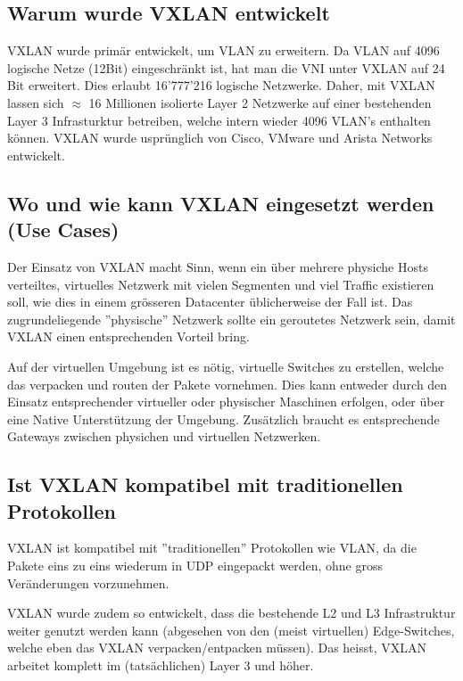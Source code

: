 \subsection{Warum wurde VXLAN entwickelt}
VXLAN wurde primär entwickelt, um VLAN zu erweitern. Da VLAN auf 4096 logische Netze (12Bit) eingeschränkt ist, hat man die VNI unter VXLAN auf 24 Bit erweitert. Dies erlaubt 16'777'216 logische Netzwerke. Daher, mit VXLAN lassen sich $\approx$ 16 Millionen isolierte Layer 2 Netzwerke auf einer bestehenden Layer 3 Infrasturktur betreiben, welche intern wieder 4096 VLAN's enthalten können. VXLAN wurde usprünglich von Cisco, VMware und Arista Networks entwickelt. 

\subsection{Wo und wie kann VXLAN eingesetzt werden (Use Cases)}

Der Einsatz von VXLAN macht Sinn, wenn ein über mehrere physiche Hosts verteiltes, virtuelles Netzwerk mit vielen Segmenten und viel Traffic existieren soll, wie dies in einem grösseren Datacenter üblicherweise der Fall ist. Das zugrundeliegende ''physische'' Netzwerk sollte ein geroutetes Netzwerk sein, damit VXLAN einen entsprechenden Vorteil bring.

Auf der virtuellen Umgebung ist es nötig, virtuelle Switches zu erstellen, welche das verpacken und routen der Pakete vornehmen. Dies kann entweder durch den Einsatz entsprechender virtueller oder physischer Maschinen erfolgen, oder über eine Native Unterstützung der Umgebung. Zusätzlich braucht es entsprechende Gateways zwischen physichen und virtuellen Netzwerken.

\subsection{Ist VXLAN kompatibel mit traditionellen Protokollen}

VXLAN ist kompatibel mit ''traditionellen'' Protokollen wie VLAN, da die Pakete eins zu eins wiederum in UDP eingepackt werden, ohne gross Veränderungen vorzunehmen. 

VXLAN wurde zudem so entwickelt, dass die bestehende L2 und L3 Infrastruktur weiter genutzt werden kann (abgesehen von den (meist virtuellen) Edge-Switches, welche eben das VXLAN verpacken/entpacken müssen). Das heisst, VXLAN arbeitet komplett im (tatsächlichen) Layer 3 und höher.

